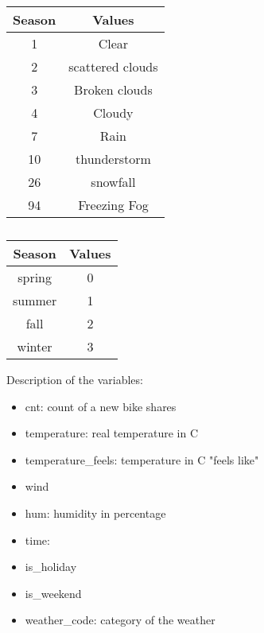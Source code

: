 \documentclass[letterpaper,11pt]{article}
\begin{document}
\begin{table}[!htb]
    	\begin{minipage}{.5\linewidth}
      \centering
        \begin{tabular}{cc} 
\hline
\multicolumn{1}{c}{Season} & \multicolumn{1}{c}{Values} \\
\hline
1 &   Clear \\
2 &  scattered clouds  \\
3 & Broken clouds\\
4 &Cloudy\\

7 &   Rain \\
10 &  thunderstorm  \\
26 & snowfall\\
94 &Freezing Fog\\
\hline
\end{tabular}
    \end{minipage}%
    \begin{minipage}{.5\linewidth}
      \centering
        \caption{}
       \begin{tabular}{cc} 
\hline
\multicolumn{1}{c}{Season} & \multicolumn{1}{c}{Values} \\
\hline
spring &   0 \\
summer &  1  \\
fall & 2\\
winter &3\\
\hline
\end{tabular}
\caption{}
 \end{minipage} 
\end{table}

Description of the variables:


\begin{itemize}
\item cnt: count of a new bike shares
\item temperature: real temperature in C
\item temperature\_feels:  temperature in C "feels like"
\item wind
\item hum: humidity in percentage
\item time: 
\item is\_holiday 
\item is\_weekend 
\item weather\_code: category of the weather
\end{itemize}
\end{document}
